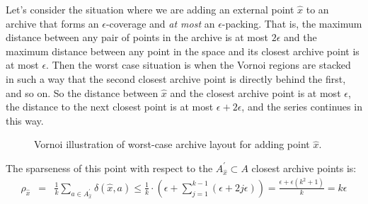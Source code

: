 \documentclass[twoside]{article}
\begin{document}
Let's consider the situation where we are adding an external point $\hat{x}$ to an archive that forms an $\epsilon$-coverage and \emph{at most} an $\epsilon$-packing.  That is, the maximum distance between any pair of points in the archive is at most $2\epsilon$ and the maximum distance between any point in the space and its closest archive point is at most $\epsilon$.  Then the worst case situation is when the Vornoi regions are stacked in such a way that the second closest archive point is directly behind the first, and so on.  So the distance between $\hat{x}$ and the closest archive point is at most $\epsilon$, the distance to the next closest point is at most $\epsilon + 2\epsilon$, and the series continues in this way.
%
\begin{figure}[ht]
  \center{}
  \caption{\label{fig:vornoi} Vornoi illustration of worst-case archive layout for adding point $\hat{x}$.}
\end{figure}

The sparseness of this point with respect to the $A^\prime_{\hat{x}} \subset A$ closest archive points is:
\begin{eqnarray*}
  \rho_{\hat{x}} & = & \frac{1}{k} \sum_{a \in A^\prime_{\hat{x}}} \delta(\hat{x},a) 
                 \leq  \frac{1}{k} \cdot\left( \epsilon + \sum_{j=1}^{k-1} \left( \epsilon + 2j\epsilon \right) \right) %
                 = \frac{\epsilon + \epsilon\left(k^2 +1\right)}{k} 
                 = k\epsilon
\end{eqnarray*}
\end{document}
